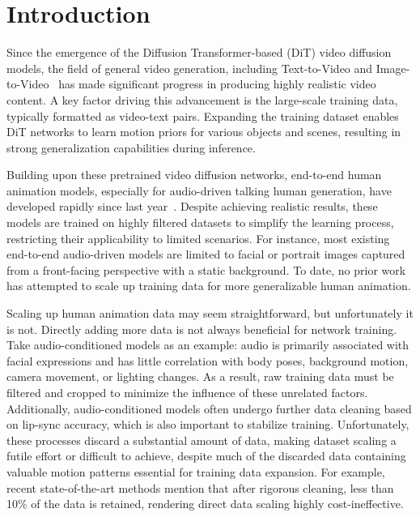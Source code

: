\section{Introduction}
Since the emergence of the Diffusion Transformer-based (DiT) video diffusion models, the field of general video generation, including Text-to-Video and Image-to-Video~\cite{bar2024lumiere,svd,ayl,guo2023animatediff,zhou2022magicvideo,walt,wang2023modelscope,vdm,videogan,cvideogan,singer2022make,text2video,villegas2022phenaki,lin2025apt} has made significant progress in producing highly realistic video content. A key factor driving this advancement is the large-scale training data, typically formatted as video-text pairs. Expanding the training dataset enables DiT networks to learn motion priors for various objects and scenes, resulting in strong generalization capabilities during inference.

Building upon these pretrained video diffusion networks, end-to-end human animation models, especially for audio-driven talking human generation, have developed rapidly since last year~\cite{he2023gaia,tian2024emo,xu2024hallo,wang2024vexpress,chen2024echomimic,xu2024vasa,stypulkowski2024diffused,jiang2024loopy,lin2025cyberhost}. 
Despite achieving realistic results, these models are trained on highly filtered datasets to simplify the learning process, restricting their applicability to limited scenarios. 
For instance, most existing end-to-end audio-driven models are limited to facial or portrait images captured from a front-facing perspective with a static background. To date, no prior work has attempted to scale up training data for more generalizable human animation.

Scaling up human animation data may seem straightforward, but unfortunately it is not. Directly adding more data is not always beneficial for network training. 
Take audio-conditioned models as an example: audio is primarily associated with facial expressions and has little correlation with body poses, background motion, camera movement, or lighting changes. As a result, raw training data must be filtered and cropped to minimize the influence of these unrelated factors. Additionally, audio-conditioned models often undergo further data cleaning based on lip-sync accuracy, which is also important to stabilize training. 
Unfortunately, these processes discard a substantial amount of data, making dataset scaling a futile effort or difficult to achieve, despite much of the discarded data containing valuable motion patterns essential for training data expansion. For example, recent state-of-the-art methods mention that after rigorous cleaning, less than 10\% of the data is retained, rendering direct data scaling highly cost-ineffective.

